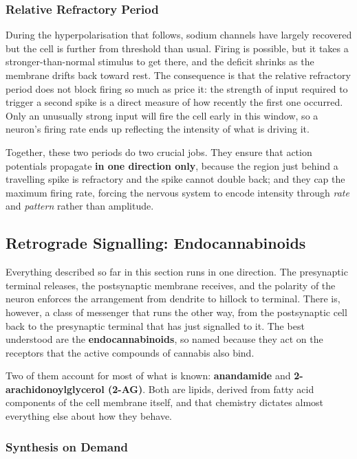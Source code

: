 \documentclass[11pt]{article}
\begin{document}
\subsubsection{Relative Refractory Period}

During the hyperpolarisation that follows, sodium channels have largely recovered but the cell is further from threshold than usual. Firing is possible, but it takes a stronger-than-normal stimulus to get there, and the deficit shrinks as the membrane drifts back toward rest. The consequence is that the relative refractory period does not block firing so much as price it: the strength of input required to trigger a second spike is a direct measure of how recently the first one occurred. Only an unusually strong input will fire the cell early in this window, so a neuron's firing rate ends up reflecting the intensity of what is driving it.

Together, these two periods do two crucial jobs. They ensure that action potentials propagate \textbf{in one direction only}, because the region just behind a travelling spike is refractory and the spike cannot double back; and they cap the maximum firing rate, forcing the nervous system to encode intensity through \textit{rate} and \textit{pattern} rather than amplitude.

\subsection{Retrograde Signalling: Endocannabinoids}

Everything described so far in this section runs in one direction. The presynaptic terminal releases, the postsynaptic membrane receives, and the polarity of the neuron enforces the arrangement from dendrite to hillock to terminal. There is, however, a class of messenger that runs the other way, from the postsynaptic cell back to the presynaptic terminal that has just signalled to it. The best understood are the \textbf{endocannabinoids}, so named because they act on the receptors that the active compounds of cannabis also bind.

Two of them account for most of what is known: \textbf{anandamide} and \textbf{2-arachidonoylglycerol (2-AG)}. Both are lipids, derived from fatty acid components of the cell membrane itself, and that chemistry dictates almost everything else about how they behave.

\subsubsection{Synthesis on Demand}
\end{document}
